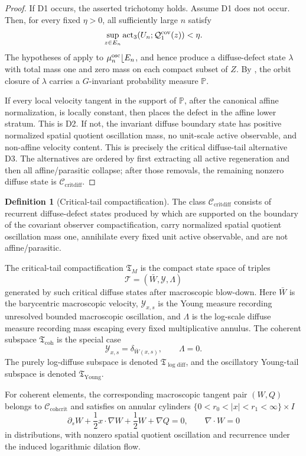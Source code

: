 \documentclass[11pt]{amsart}
\numberwithin{equation}{section}
\theoremstyle{plain}
\theoremstyle{definition}
\newtheorem{definition}[theorem]{Definition}
\theoremstyle{remark}
\newcommand{\Ccritdiff}{\mathcal C_{\mathrm{critdiff}}}
\newcommand{\Ccohcrit}{\mathcal C_{\mathrm{cohcrit}}}
\newcommand{\Tcrit}{\mathfrak T_M}
\newcommand{\Tcoh}{\mathfrak T_{\mathrm{coh}}}
\newcommand{\Tyoung}{\mathfrak T_{\mathrm{Young}}}
\newcommand{\Tlogdiff}{\mathfrak T_{\log\mathrm{diff}}}
\newcommand{\actthree}{\operatorname{act}_3}
\begin{document}
\begin{proof}
If D1 occurs, the asserted trichotomy holds.  Assume D1 does not occur.  Then, for
every fixed \(\eta>0\), all sufficiently large \(n\) satisfy
\[
   \sup_{z\in E_n}
      \actthree(U_n;\mathcal Q_1^{\rm cov}(z))<\eta .
\]
The hypotheses of  apply to
\(\mu_n^{\rm osc}\lfloor E_n\), and hence produce a diffuse-defect state
\(\lambda\) with total mass one and zero mass on each compact subset of \(Z\).
By , the orbit closure of
\(\lambda\) carries a \(G\)-invariant probability measure \(\mathbb P\).

If every local velocity tangent in the support of \(\mathbb P\), after the
canonical affine normalization, is locally constant, then
 places the defect in the affine
lower stratum.  This is D2.  If not, the invariant diffuse boundary state has
positive normalized spatial quotient oscillation mass, no unit-scale active
observable, and non-affine velocity content.  This is precisely the critical diffuse-tail
alternative D3.  The alternatives are ordered by first extracting all active
regeneration and then all affine/parasitic collapse; after those removals, the
remaining nonzero diffuse state is \(\Ccritdiff\).
\end{proof}

\begin{definition}[Critical-tail compactification]
\label{def:critical-diffuse-tail-strata}
The class \(\Ccritdiff\) consists of recurrent diffuse-defect states produced
by  which are supported on the boundary of
the covariant observer compactification, carry normalized spatial quotient oscillation
mass one, annihilate every fixed unit active observable, and are not
affine/parasitic.

The critical-tail compactification \(\Tcrit\) is the compact state space of
triples
\[
   \mathcal T=(\bar W,\mathcal Y,\Lambda)
\]
generated by such critical diffuse states after macroscopic blow-down.  Here
\(\bar W\) is the barycentric macroscopic velocity, \(\mathcal Y_{x,s}\) is the
Young measure recording unresolved bounded macroscopic oscillation, and
\(\Lambda\) is the log-scale diffuse measure recording mass escaping every fixed
multiplicative annulus.  The coherent subspace \(\Tcoh\) is the special case
\[
   \mathcal Y_{x,s}=\delta_{\bar W(x,s)},\qquad \Lambda=0.
\]
The purely log-diffuse subspace is denoted \(\Tlogdiff\), and the oscillatory
Young-tail subspace is denoted \(\Tyoung\).

For coherent elements, the corresponding macroscopic tangent pair \((W,Q)\)
belongs to \(\Ccohcrit\) and satisfies on annular cylinders
\(\{0<r_0<|x|<r_1<\infty\}\times I\)
\[
   \partial_s W+\frac12 x\cdot\nabla W+\frac12W+\nabla Q=0,
   \qquad
   \nabla\cdot W=0
\]
in distributions, with nonzero spatial quotient oscillation and
recurrence under the induced logarithmic dilation flow.
\end{definition}
\end{document}
